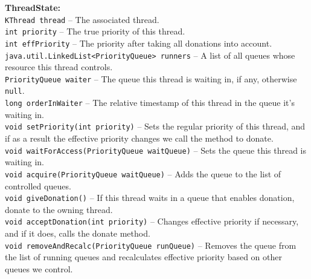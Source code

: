 \documentclass[11pt]{article}
\begin{document}
\textbf{ThreadState:} \\
\texttt{KThread thread} -- The associated thread. \\
\texttt{int priority} -- The true priority of this thread. \\
\texttt{int effPriority} -- The priority after taking all donations into account. \\
\texttt{java.util.LinkedList<PriorityQueue> runners} -- A list of all queues whose resource this thread controls. \\
\texttt{PriorityQueue waiter} -- The queue this thread is waiting in, if any, otherwise \texttt{null}. \\
\texttt{long orderInWaiter} -- The relative timestamp of this thread in the queue it's waiting in. \\
\texttt{void setPriority(int priority)} -- Sets the regular priority of this thread, and if as a result the effective priority changes we call the method to donate. \\
\texttt{void waitForAccess(PriorityQueue waitQueue)} -- Sets the queue this thread is waiting in. \\
\texttt{void acquire(PriorityQueue waitQueue)} -- Adds the queue to the list of controlled queues. \\
\texttt{void giveDonation()} -- If this thread waits in a queue that enables donation, donate to the owning thread. \\
\texttt{void acceptDonation(int priority)} -- Changes effective priority if necessary, and if it does, calls the donate method. \\
\texttt{void removeAndRecalc(PriorityQueue runQueue)} -- Removes the queue from the list of running queues and recalculates effective priority based on other queues we control. \\
\end{document}
